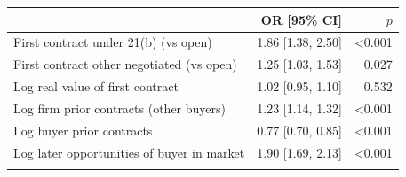 \begin{tabular}{@{}lrr@{}}
\toprule
 & OR [95\% CI] & $p$\\
\midrule
First contract under 21(b) (vs open) & 1.86 [1.38, 2.50] & <0.001\\
First contract other negotiated (vs open) & 1.25 [1.03, 1.53] & 0.027\\
Log real value of first contract & 1.02 [0.95, 1.10] & 0.532\\
Log firm prior contracts (other buyers) & 1.23 [1.14, 1.32] & <0.001\\
Log buyer prior contracts & 0.77 [0.70, 0.85] & <0.001\\
Log later opportunities of buyer in market & 1.90 [1.69, 2.13] & <0.001\\
\botrule
\end{tabular}